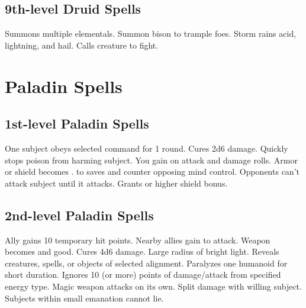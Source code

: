 \subsection{9th-level Druid Spells}
\begin{spelllist}
   Summons multiple elementals.
   Summon bison to trample foes.
   Storm rains acid, lightning, and hail.
   Calls creature to fight.
\end{spelllist}

\section{Paladin Spells}  

\subsection{1st-level Paladin Spells}
\begin{spelllist}
   One subject obeys selected command for 1 round.
   Cures 2d6 damage.
   Quickly stops poison from harming subject.
   You gain  on attack and damage rolls.
   Armor or shield becomes .
    to saves and counter opposing mind control.
   Opponents can't attack subject until it attacks.
   Grants  or higher shield bonus.
\end{spelllist}

\subsection{2nd-level Paladin Spells}
\begin{spelllist}
   Ally gains 10 temporary hit points.
   Nearby allies gain  to attack.
   Weapon becomes  and good.
   Cures 4d6 damage.
   Large radius of bright light.
   Reveals creatures, spells, or objects of selected alignment.
   Paralyzes one humanoid for short duration.
   Ignores 10 (or more) points of damage/attack from specified energy type.
   Magic weapon attacks on its own.
   Split damage with willing subject.
   Subjects within small emanation cannot lie.
\end{spelllist}

